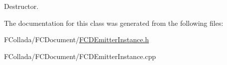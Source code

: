 \label{classFCDEmitterInstance_a2a130dc123cdf1ed9c62fb87db99524f}
Destructor. 

The documentation for this class was generated from the following files:\begin{DoxyCompactItemize}
\item 
FCollada/FCDocument/\hyperlink{FCDEmitterInstance_8h}{FCDEmitterInstance.h}\item 
FCollada/FCDocument/FCDEmitterInstance.cpp\end{DoxyCompactItemize}
